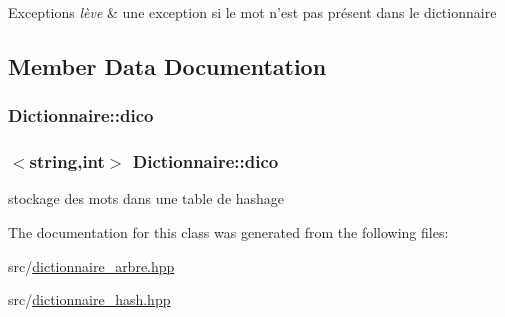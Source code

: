\begin{DoxyExceptions}{Exceptions}
{\em lève} & une exception si le mot n'est pas présent dans le dictionnaire \\
\hline
\end{DoxyExceptions}


\subsection{Member Data Documentation}
\hypertarget{class_dictionnaire_af199a172c623826621b6df871ecb5aed}{
\subsubsection[{dico}]{ Dictionnaire\-::dico\hspace{0.3cm}{\ttfamily [private]}}}\label{class_dictionnaire_af199a172c623826621b6df871ecb5aed}
\hypertarget{class_dictionnaire_ae35aafc505cc69d3fd7f9c95609246a9}{
\subsubsection[{dico}]{$<$string,int$>$ Dictionnaire\-::dico\hspace{0.3cm}{\ttfamily [private]}}}\label{class_dictionnaire_ae35aafc505cc69d3fd7f9c95609246a9}
stockage des mots dans une table de hashage 

The documentation for this class was generated from the following files\-:\begin{DoxyCompactItemize}
\item 
src/\hyperlink{dictionnaire__arbre_8hpp}{dictionnaire\-\_\-arbre.\-hpp}\item 
src/\hyperlink{dictionnaire__hash_8hpp}{dictionnaire\-\_\-hash.\-hpp}\end{DoxyCompactItemize}
